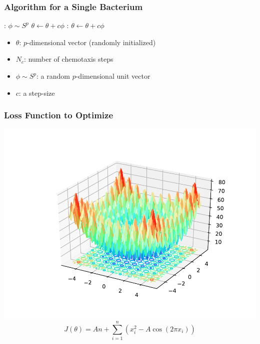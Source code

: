 \documentclass{beamer}
\begin{document}
\begin{frame}
\frametitle{Algorithm for a Single Bacterium}
\begin{algorithmic}[1]
:
  \State $\phi \sim S^p$
  \State $\theta \gets \theta + c \phi$
  :
    \State $\theta \gets \theta + c \phi$
  \EndWhile
\EndFor
\end{algorithmic}
\begin{itemize}
  \item $\theta$: $p$-dimensional vector (randomly initialized)
  \item $N_c$: number of chemotaxis steps
  \item $\phi \sim S^p$: a random $p$-dimensional unit vector
  \item $c$: a step-size
\end{itemize}
\end{frame}

\begin{frame}
\frametitle{Loss Function to Optimize}
\begin{center}
\includegraphics[scale=0.5]{assets/rastrigin}
$$J(\theta) = An + \sum_{i=1}^n \left( x_i^2 - A \cos(2 \pi x_i) \right)$$
\end{center}
\end{frame}
\end{document}
